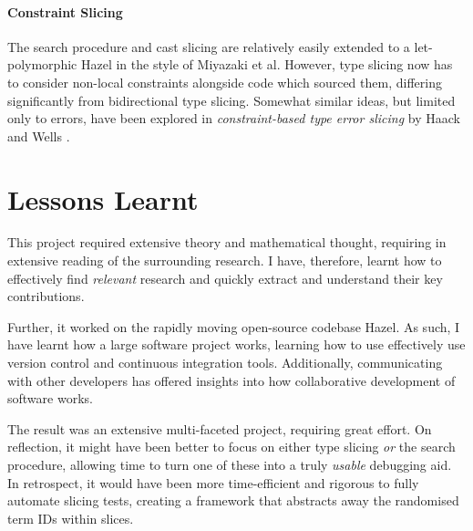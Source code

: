 \paragraph{Constraint Slicing}
The search procedure and cast slicing are relatively easily extended to a let-polymorphic Hazel in the style of Miyazaki et al. However, type slicing now has to consider non-local constraints alongside code which sourced them, differing significantly from bidirectional type slicing. Somewhat similar ideas, but limited only to errors, have been explored in \textit{constraint-based type error slicing} by Haack and Wells \cite{HaackErrSlice}.

\section{Lessons Learnt}
This project required extensive theory and mathematical thought, requiring in extensive reading of the surrounding research. I have, therefore, learnt how to effectively find \textit{relevant} research and quickly extract and understand their key contributions.

Further, it worked on the rapidly moving open-source codebase Hazel. As such, I have learnt how a large software project works, learning how to use effectively use version control and continuous integration tools. Additionally, communicating with other developers has offered insights into how collaborative development of software works.

The result was an extensive multi-faceted project, requiring great effort. On reflection, it might have been better to focus on either type slicing \textit{or} the search procedure, allowing time to turn one of these into a truly \textit{usable} debugging aid. In retrospect, it would have been more time-efficient and rigorous to fully automate slicing tests, creating a framework that abstracts away the randomised term IDs within slices.